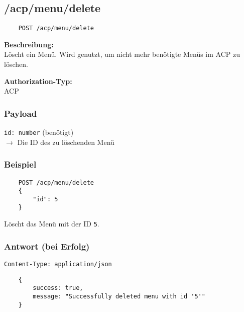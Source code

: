 \subsection{/acp/menu/delete}

\begin{lstlisting}
    POST /acp/menu/delete
\end{lstlisting}

\textbf{Beschreibung:} \\
Löscht ein Menü. Wird genutzt, um nicht mehr benötigte Menüs im ACP zu löschen.

\textbf{Authorization-Typ:} \\
ACP

\subsubsection{Payload}

\lstinline{id: number} (benötigt) \\
$\rightarrow$ Die ID des zu löschenden Menü

\subsubsection{Beispiel}

\begin{lstlisting}
    POST /acp/menu/delete
    {
        "id": 5
    }
\end{lstlisting}

Löscht das Menü mit der ID \lstinline{5}.

\subsubsection{Antwort (bei Erfolg)}

\lstinline{Content-Type: application/json}
\begin{lstlisting}
    {
        success: true, 
        message: "Successfully deleted menu with id '5'"
    }
\end{lstlisting}